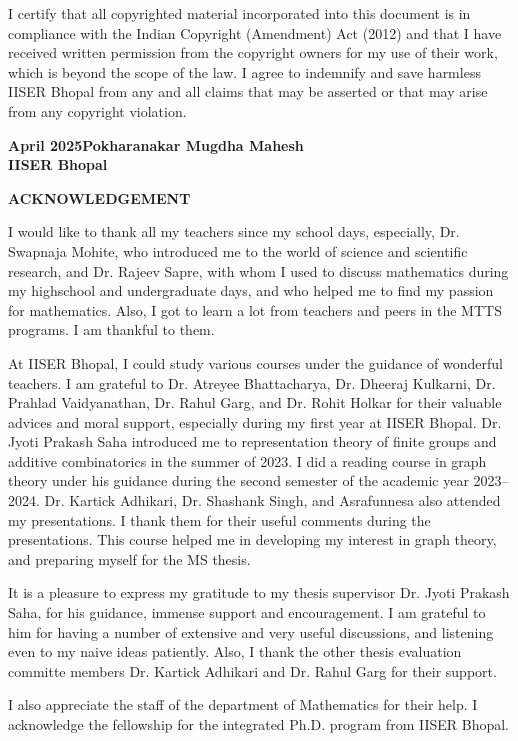 \documentclass[12pt,a4paper,bold]{thesis}
\theoremstyle{definition}
\newcommand{\head}[1]{\newpage
\phantomsection %
\addcontentsline{toc}{chapter}{#1}
\vspace{3em}
\begin{center}
\LARGE{\MakeUppercase{\textbf{#1}}}
\end{center}
\vspace{3em}
}
\newcommand{\studentname}{Pokharanakar Mugdha Mahesh}
\newcommand{\thesisdate}{April 2025}
\begin{document}
I certify that all copyrighted material incorporated into this document is in compliance with the Indian Copyright (Amendment) Act (2012) and that I have received written permission from the copyright owners for my use of their work, which is beyond the scope of the law. I agree to indemnify and save harmless IISER Bhopal from any and all claims that may be asserted or that may arise from any copyright violation.

\vspace{7em} %
\textbf{\thesisdate \hfill \studentname \\ IISER Bhopal}

\head{Acknowledgement}

I would like to thank all my teachers since my school days, especially, Dr. Swapnaja Mohite,
who introduced me to the world of science and scientific research, and Dr. Rajeev Sapre,
with whom I used to discuss mathematics during my highschool and undergraduate days, 
and who helped me to find my passion for mathematics. Also, I got to learn a lot 
from teachers and peers in the MTTS programs. I am thankful to them.

At IISER Bhopal, I could study various courses under the guidance of wonderful teachers.
I am grateful to Dr. Atreyee Bhattacharya, Dr. Dheeraj Kulkarni, Dr. Prahlad Vaidyanathan, 
Dr. Rahul Garg, and Dr. Rohit Holkar for their valuable advices and moral support,
especially during my first year at IISER Bhopal. Dr. Jyoti Prakash Saha introduced me 
to representation theory of finite groups and additive combinatorics in the summer 
of 2023. I did a reading course in graph theory under his guidance during 
the second semester of the academic year 2023--2024. Dr. Kartick Adhikari,
Dr. Shashank Singh, and Asrafunnesa also attended my presentations. I thank them
for their useful comments during the presentations. This course helped me in 
developing my interest in graph theory, and preparing myself for the MS thesis.

It is a pleasure to express my gratitude to my thesis supervisor Dr. Jyoti Prakash Saha,
for his guidance, immense support and encouragement. I am grateful to him for
having a number of extensive and very useful discussions, and listening even to 
my naive ideas patiently. Also, I thank the other thesis evaluation committe members 
Dr. Kartick Adhikari and Dr. Rahul Garg for their support. 

I also appreciate the staff of the department of Mathematics for their help. 
I acknowledge the fellowship for the integrated Ph.D. program from IISER Bhopal.
\end{document}
